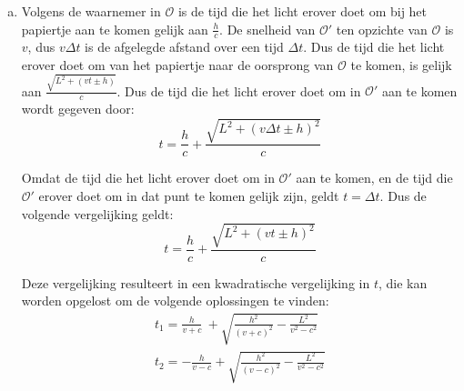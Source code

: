 \documentclass[12pt, a4paper]{article}
\begin{document}
\begin{enumerate}[(a).]
    \item \label{iteme}
    Volgens de waarnemer in $\mathcal{O}$ is de tijd die het licht erover doet om bij
    het papiertje aan te komen gelijk aan $\frac{h}{c}$. 
    De snelheid van $\mathcal{O}'$ ten opzichte van $\mathcal{O}$ is $v$,
    dus $v \Delta t$ is de afgelegde afstand over een tijd $\Delta t$.
    Dus de tijd die het licht erover doet om van het papiertje naar de oorsprong van
    $\mathcal{O}$ te komen, is gelijk aan $\frac{\sqrt{L^2 + (vt \pm h)}}{c}$.
    Dus de tijd die het licht erover doet om in $\mathcal{O}'$ aan te komen 
    wordt gegeven door:
    \begin{equation}
        t = \frac{h}{c} + \frac{\sqrt{L^2 + \left(v \Delta t \pm h\right)^2}}{c}
    \end{equation}
    
    \newpage
    Omdat de tijd die het licht erover doet om in $\mathcal{O}'$ aan te komen,
    en de tijd die $\mathcal{O}'$ erover doet om in dat punt te komen gelijk zijn,
    geldt $t = \Delta t$. Dus de volgende vergelijking geldt:
    \begin{equation}
        t = \frac{h}{c} + \frac{\sqrt{L^2 + \left(vt \pm h\right)^2}}{c}
    \end{equation}

    Deze vergelijking resulteert in een kwadratische vergelijking in $t$, 
    die kan worden opgelost om de volgende oplossingen te vinden:
    \begin{equation}
        \begin{split}
            t_1 = \frac{h}{v+c}\ +\sqrt{\frac{h^{2}}{\left(v+c\right)^{2}}-\frac{L^{2}}{v^{2}-c^{2}}}\\
            t_2 = -\frac{h}{v-c}+\sqrt{\frac{h^{2}}{\left(v-c\right)^{2}}-\frac{L^{2}}{v^{2}-c^{2}}}  
        \end{split}
    \end{equation}
    

\end{enumerate}
\end{document}
